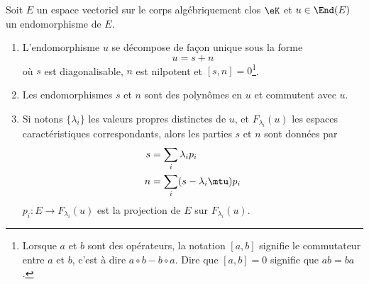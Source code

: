 \begin{theorem} \label{ThoRURcpW}
	Soit \( E\) un espace vectoriel sur le corps algébriquement clos \( \eK\) et \( u\in\End(E)\) un endomorphisme de \( E\).

	\begin{enumerate}
		\item

		      L'endomorphisme \( u\) se décompose de façon unique sous la forme
		      \begin{equation}
			      u=s+n
		      \end{equation}
		      où \( s\) est diagonalisable, \( n\) est nilpotent et \( [s,n]=0\)\footnote{Lorsque \( a\) et \( b\) sont des opérateurs, la notation \( [a,b]\) signifie le commutateur entre \( a\) et \( b\), c'est à dire \( a\circ b-b\circ a\). Dire que \( [a,b]=0\) signifie que \( ab=ba\).}.
		\item
		      Les endomorphismes \( s\) et \( n\) sont des polynômes en \( u\) et commutent avec \( u\).
		\item   \label{ItemThoRURcpWiii}
		      Si notons \( \{ \lambda_i \}\) les valeurs propres distinctes de \( u\), et \( F_{\lambda_i}(u)\) les espaces caractéristiques correspondants, alors les parties \( s\) et \( n\) sont données par
		      \begin{subequations}
			      \begin{align}
				      s & =\sum_i\lambda_ip_i         \\
				      n & =\sum_i(s-\lambda_i\mtu)p_i
			      \end{align}
		      \end{subequations}
		      \( p_i\colon E\to F_{\lambda_i}(u)\) est la projection de \( E\) sur \( F_{\lambda_i}(u)\).
	\end{enumerate}
\end{theorem}

